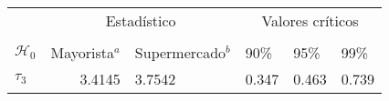 \documentclass[border=3mm,preview]{standalone}
\numberwithin{equation}{section}
\begin{document}
\centering
\begin{varwidth}{\linewidth}
\begin{tabular}{@{}lrllll@{}}
\toprule
\multicolumn{1}{l}{} & \multicolumn{2}{c}{Estadístico} &
\multicolumn{3}{c}{Valores críticos} \\
\cmidrule(l){2-3} \cmidrule(l){4-6} \\
\multicolumn{1}{l}{$\mathcal{H}_0$} & \multicolumn{1}{c}{Mayorista$^{a}$} &
 \multicolumn{1}{c}{Supermercado$^{b}$} &
\multicolumn{1}{l}{90\%}&
\multicolumn{1}{l}{95\%}&
\multicolumn{1}{l}{99\%}
\\
\midrule
$\tau_{3} $  & 3.4145 &  3.7542 & 0.347 & 0.463 & 0.739 \\
\bottomrule
\end{tabular}
\end{varwidth}
\end{document}
